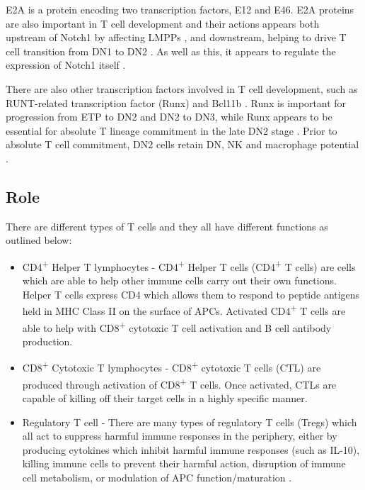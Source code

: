E2A is a protein encoding two transcription factors, E12 and E46.
E2A proteins are also important in T cell development and their actions appears both upstream of Notch1 by affecting LMPPs \citep{Dias2008}, and downstream, helping to drive T cell transition from DN1 to DN2 \citep{Naito2011}.
As well as this, it appears to regulate the expression of Notch1 itself \citep{Dias2008}.

There are also other transcription factors involved in T cell development, such as RUNT-related transcription factor (Runx) and Bcl11b \citep{Naito2011, Liu2010}.
Runx is important for progression from ETP to DN2 and DN2 to DN3, while Runx appears to be essential for absolute T lineage commitment in the late DN2 stage \citep{Liu2010, Naito2011}. 
Prior to absolute T cell commitment, DN2 cells retain DN, NK and macrophage potential \citep{Naito2011}.

\subsection{Role}
\label{subsec:Tcellfunctions}

There are different types of T cells and they all have different functions as outlined below:


\begin{itemize}
\item CD4\textsuperscript{+} Helper T lymphocytes - CD4\textsuperscript{+} Helper T cells (CD4\textsuperscript{+} T cells) are cells which are able to help other immune cells carry out their own functions. 
Helper T cells express CD4 which allows them to respond to peptide antigens held in MHC Class II on the surface of APCs. 
Activated CD4\textsuperscript{+} T cells are able to help with CD8\textsuperscript{+} cytotoxic T cell activation and B cell antibody production.
\item CD8\textsuperscript{+} Cytotoxic T lymphocytes - CD8\textsuperscript{+} cytotoxic T cells (CTL) are produced through activation of CD8\textsuperscript{+} T cells.
Once activated, CTLs are capable of killing off their target cells in a highly specific manner.
\item Regulatory T cell - There are many types of regulatory T cells (Tregs) which all act to suppress harmful immune responses in the periphery, either by producing cytokines which inhibit harmful immune responses (such as IL-10), killing immune cells to prevent their harmful action, disruption of immune cell metabolism, or modulation of APC function/maturation \citep{Vignali2008}. 
\end{itemize}

